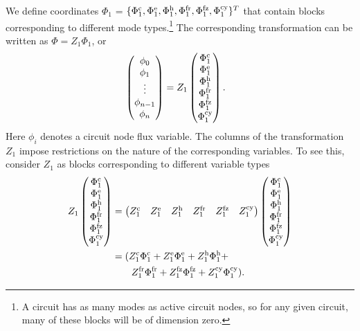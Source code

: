 We define coordinates $\Phi_1$ = $\{\Phi_1^{\rm c}, \Phi_1^{\rm e}, \Phi_1^{\rm h},        \Phi_1^{\rm fr}, \Phi_1^{\rm fz} , \Phi_1^{\rm cy}\}^T$ that contain blocks corresponding to different mode types.\footnote{A circuit has as many modes as active circuit nodes, so for any given circuit, many of these blocks will be of dimension zero.} The corresponding transformation can be written as $\Phi = Z_1\Phi_1$, or
\begin{align}
     &\begin{pmatrix}
        \phi_0 \\ \phi_1 \\ \vdots \\ \phi_{n-1} \\ \phi_n
    \end{pmatrix}
    = Z_1 
    \begin{pmatrix}
       \Phi_1^{\rm c} \\\Phi_1^{\rm e} \\ \Phi_1^{\rm h} \\
       \Phi_1^{\rm fr} \\\Phi_1^{\rm fz} \\ \Phi_1^{\rm cy}
    \end{pmatrix}.
\end{align}
Here $\phi_i$ denotes a circuit node flux variable. The columns of the transformation $Z_1$ impose restrictions on the nature of the corresponding variables. To see this, consider $Z_1$ as blocks corresponding to different variable types
\begin{align}
Z_1 
    \begin{pmatrix}
       \Phi_1^{\rm c} \\\Phi_1^{\rm e} \\ \Phi_1^{\rm h} \\
       \Phi_1^{\rm fr} \\\Phi_1^{\rm fz} \\ \Phi_1^{\rm cy}
    \end{pmatrix}&= \begin{pmatrix}
        Z_1^{\rm c} & Z_1^{\rm e} & Z_1^{\rm h} & Z_1^{\rm fr} & Z_1^{\rm fz} & Z_1^{\rm cy}
    \end{pmatrix}
    \begin{pmatrix}
       \Phi_1^{\rm c} \\\Phi_1^{\rm e} \\ \Phi_1^{\rm h} \\
       \Phi_1^{\rm fr} \\\Phi_1^{\rm fz} \\ \Phi_1^{\rm cy}
    \end{pmatrix} \nonumber \\
    &= (
       Z_1^{\rm c}\Phi_1^{\rm c} +Z_1^{\rm e}\Phi_1^{\rm e} + Z_1^{\rm h}\Phi_1^{\rm h} + \nonumber \\
    & \quad ~~~   Z_1^{\rm fr}\Phi_1^{\rm fr} + Z_1^{\rm fz}\Phi_1^{\rm fz} + Z_1^{\rm cy}\Phi_1^{\rm cy}
    ).
\end{align}
